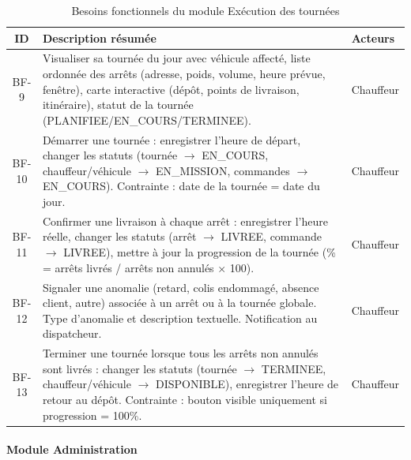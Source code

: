 \documentclass[12pt,a4paper]{report}
\begin{document}
\begin{table}[H]
\centering
\footnotesize
\begin{tabular}{|c|p{7.5cm}|p{4cm}|}
\hline
\textbf{ID} & \textbf{Description résumée} & \textbf{Acteurs} \\
\hline
BF-9 & Visualiser sa tournée du jour avec véhicule affecté, liste ordonnée des arrêts (adresse, poids, volume, heure prévue, fenêtre), carte interactive (dépôt, points de livraison, itinéraire), statut de la tournée (PLANIFIEE/EN\_COURS/TERMINEE). & Chauffeur \\
\hline
BF-10 & Démarrer une tournée : enregistrer l'heure de départ, changer les statuts (tournée $\rightarrow$ EN\_COURS, chauffeur/véhicule $\rightarrow$ EN\_MISSION, commandes $\rightarrow$ EN\_COURS). Contrainte : date de la tournée = date du jour. & Chauffeur \\
\hline
BF-11 & Confirmer une livraison à chaque arrêt : enregistrer l'heure réelle, changer les statuts (arrêt $\rightarrow$ LIVREE, commande $\rightarrow$ LIVREE), mettre à jour la progression de la tournée (\% = arrêts livrés / arrêts non annulés × 100). & Chauffeur \\
\hline
BF-12 & Signaler une anomalie (retard, colis endommagé, absence client, autre) associée à un arrêt ou à la tournée globale. Type d'anomalie et description textuelle. Notification au dispatcheur. & Chauffeur \\
\hline
BF-13 & Terminer une tournée lorsque tous les arrêts non annulés sont livrés : changer les statuts (tournée $\rightarrow$ TERMINEE, chauffeur/véhicule $\rightarrow$ DISPONIBLE), enregistrer l'heure de retour au dépôt. Contrainte : bouton visible uniquement si progression = 100\%. & Chauffeur \\
\hline
\end{tabular}
\caption{Besoins fonctionnels du module Exécution des tournées}
\label{tab:bf-execution}
\end{table}

\paragraph{Module Administration}
\end{document}
